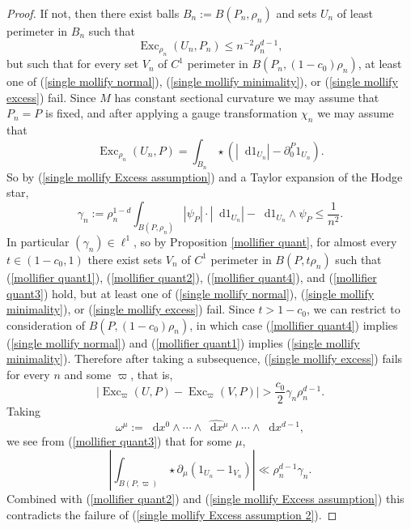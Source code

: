 \documentclass[reqno,10pt]{amsart}
\DeclareMathOperator{\Exc}{Exc}
\newcommand*\dif{\mathop{}\!\mathrm{d}}
\theoremstyle{definition}
\numberwithin{equation}{section}
\begin{document}
\begin{proof}
If not, then there exist balls $B_n := B(P_n, \rho_n)$ and sets $U_n$ of least perimeter in $B_n$ such that
\begin{equation}\label{single mollify Excess assumption}
\Exc_{\rho_n} (U_n, P_n) \leq n^{-2} \rho_n^{d - 1},
\end{equation}
but such that for every set $V_n$ of $C^1$ perimeter in $B(P_n, (1 - c_0) \rho_n)$, at least one of (\ref{single mollify normal}), (\ref{single mollify minimality}), or (\ref{single mollify excess}) fail.
Since $M$ has constant sectional curvature we may assume that $P_n = P$ is fixed, and after applying a gauge transformation $\chi_n$ we may assume that
$$\Exc_{\rho_n} (U_n, P) = \int_{B_n} \star (|\dif 1_{U_n}| - \partial_0^P 1_{U_n}).$$
So by (\ref{single mollify Excess assumption}) and a Taylor expansion of the Hodge star,
$$\gamma_n := \rho_n^{1 - d} \int_{B(P, \rho_n)} |\psi_P| \cdot |\dif 1_{U_n}| - \dif 1_{U_n} \wedge \psi_P \leq \frac{1}{n^2}.$$
In particular $(\gamma_n) \in \ell^1$, so by Proposition \ref{mollifier quant}, for almost every $t \in (1 - c_0, 1)$ there exist sets $V_n$ of $C^1$ perimeter in $B(P, t\rho_n)$ such that (\ref{mollifier quant1}), (\ref{mollifier quant2}), (\ref{mollifier quant4}), and (\ref{mollifier quant3}) hold, but at least one of (\ref{single mollify normal}), (\ref{single mollify minimality}), or (\ref{single mollify excess}) fail.
Since $t > 1 - c_0$, we can restrict to consideration of $B(P, (1 - c_0) \rho_n)$, in which case (\ref{mollifier quant4}) implies (\ref{single mollify normal}) and (\ref{mollifier quant1}) implies (\ref{single mollify minimality}).
Therefore after taking a subsequence, (\ref{single mollify excess}) fails for every $n$ and some $\varpi$, that is,
\begin{equation}\label{single mollify Excess assumption 2}
|\Exc_\varpi (U, P) - \Exc_\varpi (V, P)| > \frac{c_0}{2} \gamma_n \rho_n^{d - 1}.
\end{equation}
Taking
$$\omega^\mu := \dif x^0 \wedge \cdots \wedge \widehat{\dif x^\mu} \wedge \cdots \wedge \dif x^{d - 1},$$
we see from (\ref{mollifier quant3}) that for some $\mu$,
$$\left|\int_{B(P, \varpi)} \star \partial_\mu (1_{U_n} - 1_{V_n})\right| \ll \rho_n^{d - 1} \gamma_n.$$
Combined with (\ref{mollifier quant2}) and (\ref{single mollify Excess assumption}) this contradicts the failure of (\ref{single mollify Excess assumption 2}).
\end{proof}
\end{document}
